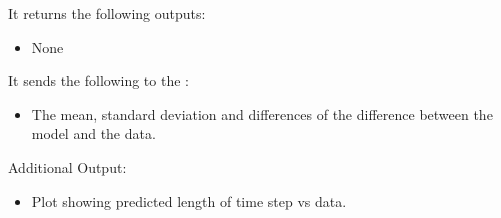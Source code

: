 It returns the following outputs:

\begin{itemize}
\item None
\end{itemize}

It sends the following to the :

\begin{itemize}
\item The mean, standard deviation and differences of the difference between the model and the data.
\end{itemize}

Additional Output:
\begin{itemize}
\item Plot showing predicted length of time step vs data.
\end{itemize}



